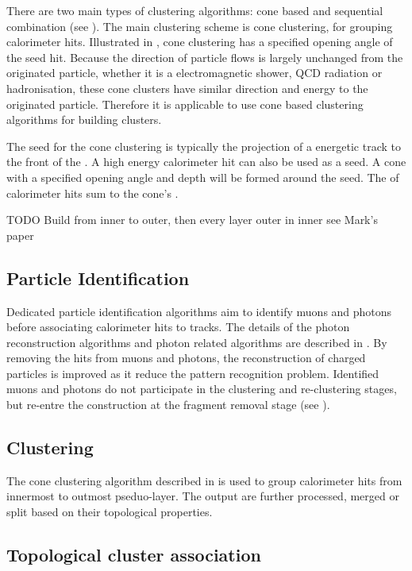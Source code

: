 There are two main types of clustering algorithms: cone based and sequential combination (see \Section{}). The main clustering scheme \pandora is cone clustering, for grouping calorimeter hits. Illustrated in , cone clustering has a specified opening angle of the seed hit. Because the direction of particle flows is largely unchanged from the originated particle, whether it is a electromagnetic shower, QCD radiation or hadronisation, these cone clusters have similar direction and energy to the originated particle. Therefore it is applicable to use cone based clustering algorithms for building clusters.

The seed for the cone clustering is typically the projection of a energetic track to the front of the \ECAL. A high  energy calorimeter hit can also be used as a seed. A cone with a specified opening angle and depth will be formed around the seed. The \fourMomentum of calorimeter hits sum to the cone's \fourMomentum.

TODO
Build from inner to outer, then every layer outer in inner see Mark's paper

\subsection{Particle Identification}
\label{sec:particleID}

Dedicated particle identification algorithms aim to identify muons and photons before associating calorimeter hits to tracks. The details of the photon reconstruction algorithms and photon related algorithms are described in . By removing the hits from muons and photons, the reconstruction of charged particles is improved as it reduce the pattern recognition problem. Identified muons and photons do not participate in the clustering and re-clustering stages, but re-entre the construction at the fragment removal stage (see ).

\subsection{Clustering}

The cone clustering algorithm described in  is used to group calorimeter hits from innermost to outmost pseduo-layer. The output \clusters are further processed, merged or split based on their topological properties.

\subsection{Topological cluster association}

